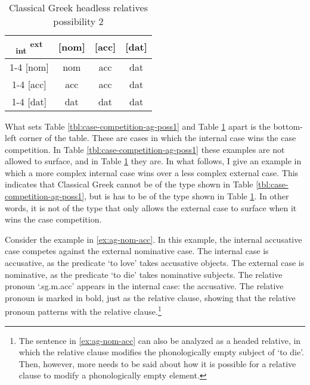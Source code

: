 \begin{table}[ht]
  \center
  \caption{Classical Greek headless relatives possibility 2}
  \begin{tabular}{c|c|c|c}
    \toprule
    \textsubscript{\ac{int}} \textsuperscript{\ac{ext}}
           & [\ac{nom}]
           & [\ac{acc}]
           & [\ac{dat}]
           \\ \cmidrule{1-4}
       [\ac{nom}]
           & \ac{nom}
           & \ac{acc}
           & \ac{dat}
           \\ \cmidrule{1-4}
       [\ac{acc}]
           & \ac{acc}
           & \ac{acc}
           & \cellcolor{LG}\ac{dat}
           \\ \cmidrule{1-4}
       [\ac{dat}]
           & \ac{dat}
           & \ac{dat}
           & \ac{dat}
           \\
     \bottomrule
  \end{tabular}
    \label{tbl:case-competition-ag-poss2}
\end{table}

What sets Table \ref{tbl:case-competition-ag-poss1} and Table \ref{tbl:case-competition-ag-poss2} apart is the bottom-left corner of the table. These are cases in which the internal case wins the case competition.
In Table \ref{tbl:case-competition-ag-poss1} these examples are not allowed to surface, and in Table \ref{tbl:case-competition-ag-poss2} they are.
In what follows, I give an example in which a more complex internal case wins over a less complex external case. This indicates that Classical Greek cannot be of the type shown in Table \ref{tbl:case-competition-ag-poss1}, but is has to be of the type shown in Table \ref{tbl:case-competition-ag-poss2}. In other words, it is not of the type that only allows the external case to surface when it wins the case competition.

Consider the example in \ref{ex:ag-nom-acc}. In this example, the internal accusative case competes against the external nominative case.
The internal case is accusative, as the predicate  `to love' takes accusative objects.
The external case is nominative, as the predicate  `to die' takes nominative subjects.
The relative pronoun  `.\ac{sg}.\ac{m}.\ac{acc}' appears in the internal case: the accusative. The relative pronoun is marked in bold, just as the relative clause, showing that the relative pronoun patterns with the relative clause.\footnote{
The sentence in \ref{ex:ag-nom-acc} can also be analyzed as a headed relative, in which the relative clause modifies the phonologically empty subject of  `to die'. Then, however, more needs to be said about how it is possible for a relative clause to modify a phonologically empty element.
}

